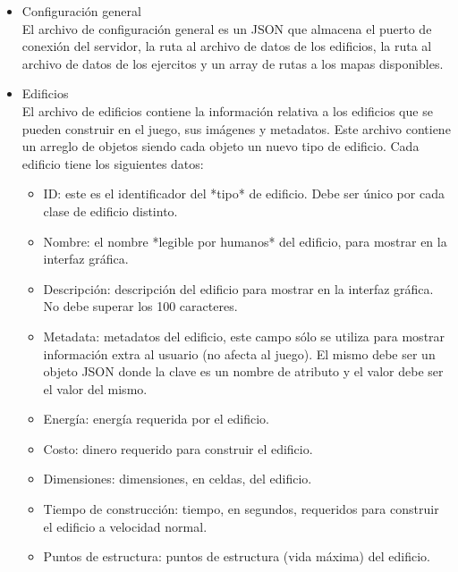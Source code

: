 \documentclass[titlepage,a4paper,12pt]{article}
\begin{document}
\begin{itemize}

\item Configuración general\\

El archivo de configuración general es un JSON que almacena el puerto de conexión del servidor, la ruta al archivo de datos de los edificios, la ruta al archivo de datos de los ejercitos y un array de rutas a los mapas disponibles.

\item Edificios\\

El archivo de edificios contiene la información relativa a los edificios que se pueden construir en el juego, sus imágenes y metadatos. Este archivo contiene un arreglo de objetos siendo cada objeto un nuevo tipo de edificio. Cada edificio tiene los siguientes datos: 

\begin{itemize}

\item ID:  este es el identificador del *tipo* de edificio. Debe ser único por cada clase de edificio distinto.

\item Nombre: el nombre *legible por humanos* del edificio, para mostrar en la interfaz gráfica.

\item Descripción: descripción del edificio para mostrar en la interfaz gráfica. No debe superar los 100 caracteres.

\item Metadata: metadatos del edificio, este campo sólo se utiliza para mostrar información extra al usuario (no afecta al juego). El mismo debe ser un objeto JSON donde la clave es un nombre de atributo y el valor debe ser el valor del mismo.

\item Energía: energía requerida por el edificio.

\item Costo: dinero requerido para construir el edificio.

\item Dimensiones: dimensiones, en celdas, del edificio.

\item Tiempo de construcción: tiempo, en segundos, requeridos para construir el edificio a velocidad normal.

\item Puntos de estructura: puntos de estructura (vida máxima) del edificio.


\end{itemize}
\end{itemize}
\end{document}
